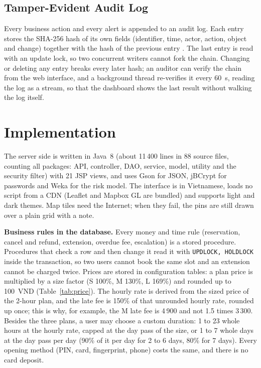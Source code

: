 \documentclass[conference, onecolumn]{IEEEtran}
\begin{document}
\subsection{Tamper-Evident Audit Log}

Every business action and every alert is appended to an audit log. Each entry stores the SHA-256 hash of its own
fields (identifier, time, actor, action, object and change) together with the hash of the previous entry
\cite{haber1991timestamp}. The last entry is read with an update lock, so two concurrent writers cannot fork the chain.
Changing or deleting any entry breaks every later hash; an auditor can verify the chain from the web interface, and a
background thread re-verifies it every 60~s, reading the log as a stream, so that the dashboard shows the last result
without walking the log itself.

\section{Implementation}

The server side is written in Java~8 (about 11\,400 lines in 88 source files, counting all packages: API, controller,
DAO, service, model, utility and the security filter) with 21 JSP views, and uses Gson for JSON, jBCrypt for passwords \cite{provos1999bcrypt} and Weka
\cite{hall2009weka} for the risk model. The interface is in Vietnamese, loads no script from a CDN (Leaflet and
Mapbox GL are bundled) and supports light and dark themes. Map tiles need the Internet; when they fail, the pins are
still drawn over a plain grid with a note.

\textbf{Business rules in the database.} Every money and time rule (reservation, cancel and refund, extension, overdue
fee, escalation) is a stored procedure. Procedures that check a row and then change it read it with
\texttt{UPDLOCK, HOLDLOCK} inside the transaction, so two users cannot book the same slot and an extension cannot be
charged twice. Prices are stored in configuration tables: a plan price is multiplied by a size factor (S 100\%, M 130\%,
L 169\%) and rounded up to 100~VND (Table~\ref{tab:price}). The hourly rate is derived from the sized price of the
2-hour plan, and the late fee is 150\% of that unrounded hourly rate, rounded up once; this is why, for example, the M
late fee is 4\,900 and not 1.5 times 3\,300. Besides the three plans, a user may choose a custom duration: 1 to 23
whole hours at the hourly rate, capped at the day pass of the size, or 1 to 7 whole days at the day pass per day
(90\% of it per day for 2 to 6 days, 80\% for 7 days). Every opening method (PIN, card, fingerprint, phone) costs the same,
and there is no card deposit.
\end{document}
